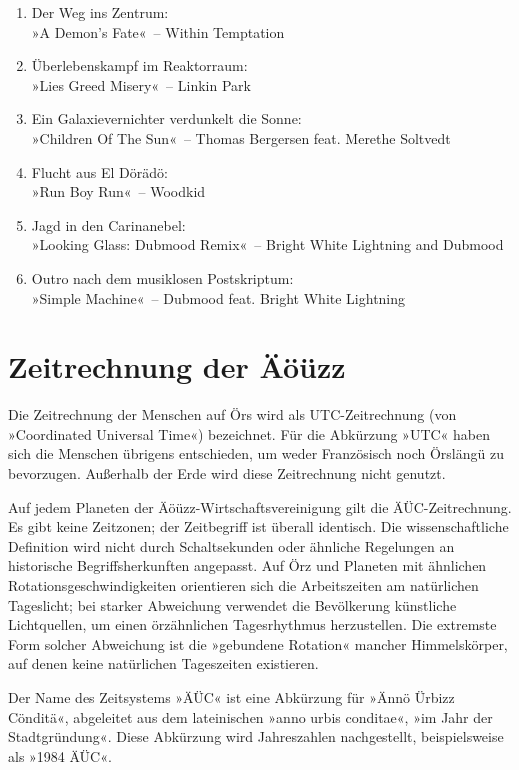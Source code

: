 \begin{enumerate}
    \item Der Weg ins Zentrum:\\ »A Demon’s Fate«~– Within Temptation
    \item Überlebenskampf im Reaktorraum:\\ »Lies Greed Misery«~– Linkin Park
    \item Ein Galaxievernichter verdunkelt die Sonne:\\ »Children Of The Sun«~– Thomas Bergersen feat. Merethe Soltvedt
    \item Flucht aus El Dörädö:\\ »Run Boy Run«~– Woodkid
    \item Jagd in den Carinanebel:\\ »Looking Glass: Dubmood Remix«~– Bright White Lightning and Dubmood
    \item Outro nach dem musiklosen Postskriptum:\\ »Simple Machine«~– Dubmood feat. Bright White Lightning
\end{enumerate}


\chapter{Zeitrechnung der Äöüzz}

Die Zeitrechnung der Menschen auf Örs wird als UTC-Zeitrechnung (von »Coordinated Universal Time«) bezeichnet. Für die Abkürzung »UTC« haben sich die Menschen übrigens entschieden, um weder Französisch noch Örslängü zu bevorzugen. Außerhalb der Erde wird diese Zeitrechnung nicht genutzt.

Auf jedem Planeten der Äöüzz-Wirtschaftsvereinigung gilt die ÄÜC-Zeitrechnung. Es gibt keine Zeitzonen; der Zeitbegriff ist überall identisch. Die wissenschaftliche Definition wird nicht durch Schaltsekunden oder ähnliche Regelungen an historische Begriffsherkunften angepasst. Auf Örz und Planeten mit ähnlichen Rotationsgeschwindigkeiten orientieren sich die Arbeitszeiten am natürlichen Tageslicht; bei starker Abweichung verwendet die Bevölkerung künstliche Lichtquellen, um einen örzähnlichen Tagesrhythmus herzustellen. Die extremste Form solcher Abweichung ist die »gebundene Rotation« mancher Himmelskörper, auf denen keine natürlichen Tageszeiten existieren.

Der Name des Zeitsystems »ÄÜC« ist eine Abkürzung für »Ännö Ürbizz Cönditä«, abgeleitet aus dem lateinischen »anno urbis conditae«, »im Jahr der Stadtgründung«. Diese Abkürzung wird Jahreszahlen nachgestellt, beispielsweise als »1984 ÄÜC«.

